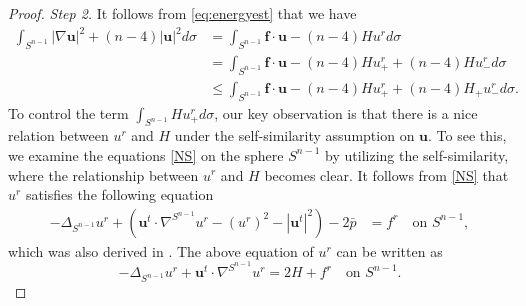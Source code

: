 \documentclass[12pt]{amsart}
\newcommand{\Bu}{{\boldsymbol{u}}}
\newcommand{\Bf}{{\boldsymbol{f}}}
\begin{document}
\begin{proof}
		
		{\it Step 2.} It follows from \eqref{eq:energyest} that we have
		\begin{equation}\label{eq:keydec}
			\begin{aligned}
				\int_{S^{n-1}} |\nabla \Bu|^2 +(n-4)|\Bu|^2 d\sigma
				& = 	\int_{S^{n-1}} \Bf\cdot \Bu -(n-4)Hu^rd\sigma \\
				& =\int_{S^{n-1}} \Bf\cdot \Bu -(n-4) H u^r_{+} + (n-4) H u^r_{-} d\sigma\\
				& \leq \int_{S^{n-1}} \Bf\cdot \Bu -(n-4)H u^r_{+} +(n-4)H_{+}u^r_{-} d\sigma.
			\end{aligned}
		\end{equation}
		To control the  term  $\int_{S^{n-1}} H u^r_+ d\sigma$, our key observation is that there is a
		nice relation between $u^r$ and $H$ under the self-similarity assumption on  $\Bu$. 
		To see this, we examine the equations \eqref{NS} on the sphere $S^{n-1}$ by utilizing the self-similarity, where the relationship between $u^r$ and $H$ becomes clear.
		It follows from \eqref{NS} that $u^r$ satisfies the following equation
		\begin{align*}
			\label{NSnorm}	
			-\Delta_{S^{n-1}}u^{r} 
			+\left( 
			\Bu^{t} \cdot \nabla^{S^{n-1}} u^{r}  -(u^{r} )^2  - |\Bu^{t}|^2
			\right)
			-2\bar p
			&= {f}^{r}
			\quad \text{on }S^{n-1},
		\end{align*} 
		which  was also derived in \cite[Appendix 1]{Sverak11}.
		The above equation  of $u^r$  can  be written as
		\begin{equation} \label{NSnorm2}
			-\Delta_{S^{n-1}}u^{r} + 
			\Bu^{t} \cdot\nabla^{S^{n-1}} u^{r}  
			= 2H+{f}^{r} \quad \text{on }S^{n-1}.
		\end{equation}

\end{proof}
\end{document}

